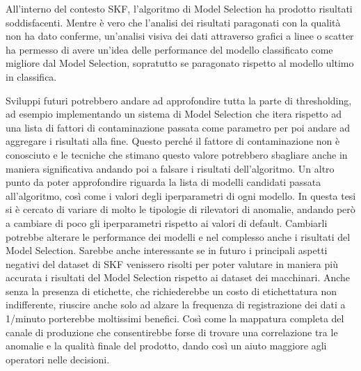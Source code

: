 All'interno del contesto SKF, l'algoritmo di Model Selection ha prodotto risultati soddisfacenti. Mentre è vero che l'analisi dei risultati paragonati con la qualità non ha dato conferme, un'analisi visiva dei dati attraverso grafici a linee o scatter ha permesso di avere un'idea delle performance del modello classificato come migliore dal Model Selection, sopratutto se paragonato rispetto al modello ultimo in classifica.

Sviluppi futuri potrebbero andare ad approfondire tutta la parte di thresholding, ad esempio implementando un sistema di Model Selection che itera rispetto ad una lista di fattori di contaminazione passata come parametro per poi andare ad aggregare i risultati alla fine. Questo perché il fattore di contaminazione non è conosciuto e le tecniche che stimano questo valore potrebbero sbagliare anche in maniera significativa andando poi a falsare i risultati dell'algoritmo.
Un altro punto da poter approfondire riguarda la lista di modelli candidati passata all'algoritmo, così come i valori degli iperparametri di ogni modello. In questa tesi si è cercato di variare di molto le tipologie di rilevatori di anomalie, andando però a cambiare di poco gli iperparametri rispetto ai valori di default. Cambiarli potrebbe alterare le performance dei modelli e nel complesso anche i risultati del Model Selection.
Sarebbe anche interessante se in futuro i principali aspetti negativi del dataset di SKF venissero risolti per poter valutare in maniera più accurata i risultati del Model Selection rispetto ai dataset dei macchinari. Anche senza la presenza di etichette, che richiederebbe un costo di etichettatura non indifferente, riuscire anche solo ad alzare la frequenza di registrazione dei dati a 1/minuto porterebbe moltissimi benefici. Così come la mappatura completa del canale di produzione che consentirebbe forse di trovare una correlazione tra le anomalie e la qualità finale del prodotto, dando così un aiuto maggiore agli operatori nelle decisioni.